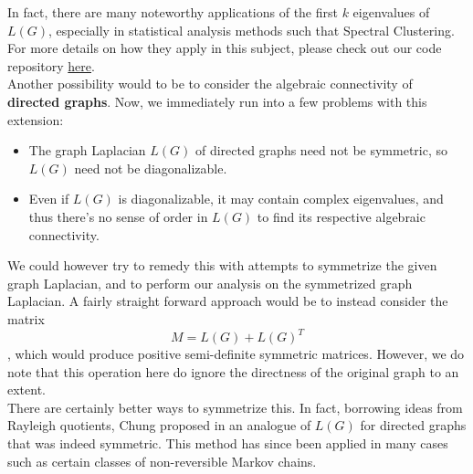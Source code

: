 \documentclass{article}
\begin{document}
In fact, there are many noteworthy applications of the first $k$ eigenvalues of $L(G)$, especially in statistical analysis methods such that Spectral Clustering. For more details on how they apply in this subject, please check out our code repository \href{https://github.com/maroon-scorch/Algebraic-Connectivity}{here}.\\

Another possibility would to be to consider the algebraic connectivity of \textbf{directed graphs}. Now, we immediately run into a few problems with this extension:
\begin{itemize}
    \item The graph Laplacian $L(G)$ of directed graphs need not be symmetric, so $L(G)$ need not be diagonalizable.
    \item Even if $L(G)$ is diagonalizable, it may contain complex eigenvalues, and thus there's no sense of order in $L(G)$ to find its respective algebraic connectivity.
\end{itemize}
We could however try to remedy this with attempts to symmetrize the given graph Laplacian, and to perform our analysis on the symmetrized graph Laplacian. A fairly straight forward approach would be to instead consider the matrix
\[M = L(G) + L(G)^T\]
, which would produce positive semi-definite symmetric matrices. However, we do note that this operation here do ignore the directness of the original graph to an extent.\\

There are certainly better ways to symmetrize this. In fact, borrowing ideas from Rayleigh quotients, Chung proposed in \cite{chung_2005} an analogue of $L(G)$ for directed graphs that was indeed symmetric. This method has since been applied in many cases such as certain classes of non-reversible Markov chains.




 
\end{document}
